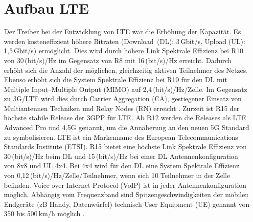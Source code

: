 
%
%
% 
% 
% 


\section{Aufbau LTE}
\label{sec:aufbau}
Der Treiber bei der Entwicklung von LTE war die Erhöhung der Kapazität. Es werden kosteneffizient höhere Bitraten (Download~(DL): 3\,Gbit/s, Upload (UL): 1,5\,Gbit/s) ermöglicht. Dies wird durch höhere Link Spektrale Effizienz bei R10 von 30\,(bit/s)/Hz im Gegensatz von R8 mit 16\,(bit/s)/Hz erreicht. Dadurch erhöht sich die Anzahl der möglichen, gleichzeitig aktiven Teilnehmer des Netzes. Ebenso erhöht sich die System Spektrale Effizienz bei R10 für den DL mit Multiple Input–Multiple Output (MIMO) auf 2,4\,(bit/s)/Hz/Zelle. Im Gegensatz zu 3G/LTE wird dies durch Carrier Aggregation (CA), gestiegener Einsatz von Multiantennen Techniken und Relay Nodes (RN) erreicht \cite{Wan13}. Zurzeit ist R15 der höchste stabile Release der 3GPP für LTE. Ab R12 werden die Releases als LTE Advanced Pro und 4,5G genannt, um die  Annäherung an den neuen 5G Standard zu symbolisieren. LTE ist ein Markenname des European Telecommunications Standards Institute (ETSI). R15 bietet eine höchste Link Spektrale Effizienz von 30\,(bit/s)/Hz beim DL und 15\,(bit/s)/Hz bei einer DL Antennenkonfiguration von 8x8 und UL 4x4. Bei 4x4 wird für den DL eine System Spektrale Effizienz von 0,12\,(bit/s)/Hz/Zelle/Teilnehmer, wenn sich 10 Teilnehmer in der Zelle befinden. Voice over Internet Protocol (VoIP) ist in jeder Antennenkonfiguration möglich. Abhängig vom Frequenzband sind Spitzengeschwindigkeiten der mobilen Endgeräte (zB Handy, Datenwürfel) technisch User Equipment (UE) genannt von 350 bis 500\,km/h möglich \cite{GPP18}.

